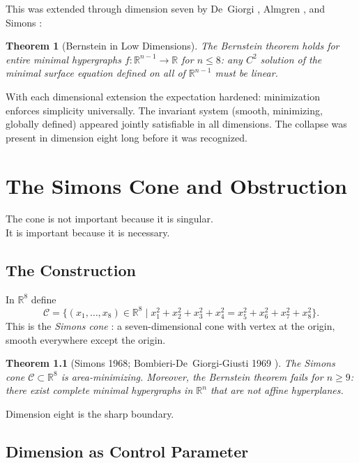 \documentclass[12pt,oneside]{book}
\theoremstyle{plain}
\newtheorem{theorem}{Theorem}[chapter]
\theoremstyle{definition}
\theoremstyle{remark}
\newcommand{\Real}{\mathbb{R}}
\begin{document}
This was extended through dimension seven by De~Giorgi \cite{degiorgi1965},
Almgren \cite{almgren1966}, and Simons \cite{simons1968}:

\begin{theorem}[Bernstein in Low Dimensions]
The Bernstein theorem holds for entire minimal hypergraphs $f:\Real^{n-1}
\to \Real$ for $n \leq 8$: any $C^2$ solution of the minimal surface equation
defined on all of $\Real^{n-1}$ must be linear.
\end{theorem}

With each dimensional extension the expectation hardened: minimization
enforces simplicity universally. The invariant system (smooth, minimizing,
globally defined) appeared jointly satisfiable in all dimensions. The collapse
was present in dimension eight long before it was recognized.

\chapter{The Simons Cone and Obstruction}

\epigraph{The cone is not important because it is singular.\\
It is important because it is necessary.}{}

\section{The Construction}

In $\Real^8$ define
\[
  \mathcal{C} = \{ (x_1,\ldots,x_8) \in \Real^8 \mid
  x_1^2 + x_2^2 + x_3^2 + x_4^2 = x_5^2 + x_6^2 + x_7^2 + x_8^2 \}.
\]
This is the \emph{Simons cone} \cite{simons1968}: a seven-dimensional cone
with vertex at the origin, smooth everywhere except the origin.

\begin{theorem}[Simons 1968; Bombieri-De~Giorgi-Giusti 1969
  \cite{simons1968,bombieri1969}]
\label{thm:simons}
The Simons cone $\mathcal{C} \subset \Real^8$ is area-minimizing. Moreover,
the Bernstein theorem fails for $n \geq 9$: there exist complete minimal
hypergraphs in $\Real^n$ that are not affine hyperplanes.
\end{theorem}

Dimension eight is the sharp boundary.

\section{Dimension as Control Parameter}
\end{document}

